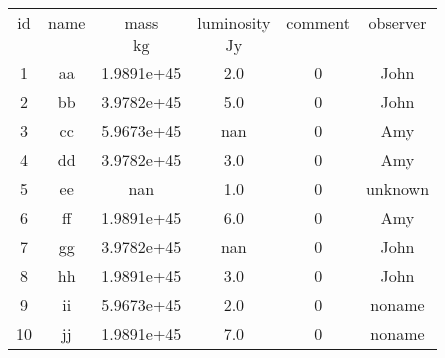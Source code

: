 \begin{table}
\begin{tabular}{cccccc}
id & name & mass & luminosity & comment & observer \\
 &  & $\mathrm{kg}$ & $\mathrm{Jy}$ &  &  \\
1 & aa & 1.9891e+45 & 2.0 & 0 & John \\
2 & bb & 3.9782e+45 & 5.0 & 0 & John \\
3 & cc & 5.9673e+45 & nan & 0 & Amy \\
4 & dd & 3.9782e+45 & 3.0 & 0 & Amy \\
5 & ee & nan & 1.0 & 0 & unknown \\
6 & ff & 1.9891e+45 & 6.0 & 0 & Amy \\
7 & gg & 3.9782e+45 & nan & 0 & John \\
8 & hh & 1.9891e+45 & 3.0 & 0 & John \\
9 & ii & 5.9673e+45 & 2.0 & 0 & noname \\
10 & jj & 1.9891e+45 & 7.0 & 0 & noname \\
\end{tabular}
\end{table}
